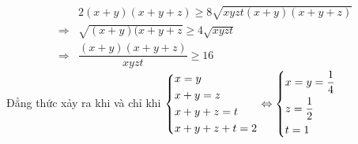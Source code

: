 \begin{ex}
{\begin{enumerate}
\begin{align*}
          & 2(x+y)(x+y+z)\geq 8\sqrt{xyzt(x+y)(x+y+z)}\\
          \Rightarrow & \sqrt{(x+y)(x+y+z} \geq 4\sqrt{xyzt}\\
          \Rightarrow & \dfrac{(x+y)(x+y+z)}{xyzt}  \geq 16
       \end{align*}
       Đẳng thức xảy ra khi và chỉ khi $\left\{\begin{aligned}&x=y\\&x+y=z\\&x+y+z=t\\&x+y+z+t=2\end{aligned}\right. \Leftrightarrow \left\{\begin{aligned}&x=y=\dfrac{1}{4}\\&z=\dfrac{1}{2}\\&t=1\end{aligned}\right.$
         
    \end{enumerate}
    }
\end{ex}
